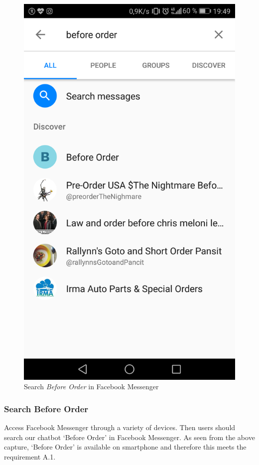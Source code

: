 \begin{figure}[htbp]
\centerline{\includegraphics[height=\custompicheight]{./pictures/Screenshot_20181125-194915}}
\caption{Search \emph{Before Order} in Facebook Messenger}
\label{fig:Before Order_search}
\end{figure}
\FloatBarrier
\subsubsection{Search Before Order}
Access Facebook Messenger through a variety of devices. Then users should search our chatbot ‘Before Order’ in Facebook Messenger. As seen from the above capture, ‘Before Order’ is available on smartphone and therefore this meets the requirement A.1.

